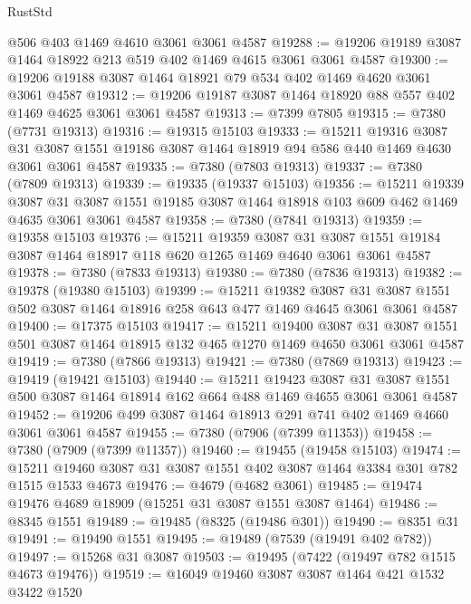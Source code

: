 \begin{lexlean}{RustStd}
\begin{coremodule}
    @506
    @403
    @1469
    @4610
    @3061
    @3061
    @4587
@19288 := @19206 @19189 @3087 @1464 @18922 @213 @519 @402 @1469 @4615 @3061 @3061 @4587
@19300 := @19206 @19188 @3087 @1464 @18921 @79 @534 @402 @1469 @4620 @3061 @3061 @4587
@19312 := @19206 @19187 @3087 @1464 @18920 @88 @557 @402 @1469 @4625 @3061 @3061 @4587
@19313 := @7399 @7805
@19315 := @7380 (@7731 @19313)
@19316 := @19315 @15103
@19333 := @15211
    @19316
    @3087
    @31
    @3087
    @1551
    @19186
    @3087
    @1464
    @18919
    @94
    @586
    @440
    @1469
    @4630
    @3061
    @3061
    @4587
@19335 := @7380 (@7803 @19313)
@19337 := @7380 (@7809 @19313)
@19339 := @19335 (@19337 @15103)
@19356 := @15211
    @19339
    @3087
    @31
    @3087
    @1551
    @19185
    @3087
    @1464
    @18918
    @103
    @609
    @462
    @1469
    @4635
    @3061
    @3061
    @4587
@19358 := @7380 (@7841 @19313)
@19359 := @19358 @15103
@19376 := @15211
    @19359
    @3087
    @31
    @3087
    @1551
    @19184
    @3087
    @1464
    @18917
    @118
    @620
    @1265
    @1469
    @4640
    @3061
    @3061
    @4587
@19378 := @7380 (@7833 @19313)
@19380 := @7380 (@7836 @19313)
@19382 := @19378 (@19380 @15103)
@19399 := @15211
    @19382
    @3087
    @31
    @3087
    @1551
    @502
    @3087
    @1464
    @18916
    @258
    @643
    @477
    @1469
    @4645
    @3061
    @3061
    @4587
@19400 := @17375 @15103
@19417 := @15211
    @19400
    @3087
    @31
    @3087
    @1551
    @501
    @3087
    @1464
    @18915
    @132
    @465
    @1270
    @1469
    @4650
    @3061
    @3061
    @4587
@19419 := @7380 (@7866 @19313)
@19421 := @7380 (@7869 @19313)
@19423 := @19419 (@19421 @15103)
@19440 := @15211
    @19423
    @3087
    @31
    @3087
    @1551
    @500
    @3087
    @1464
    @18914
    @162
    @664
    @488
    @1469
    @4655
    @3061
    @3061
    @4587
@19452 := @19206 @499 @3087 @1464 @18913 @291 @741 @402 @1469 @4660 @3061 @3061 @4587
@19455 := @7380 (@7906 (@7399 @11353))
@19458 := @7380 (@7909 (@7399 @11357))
@19460 := @19455 (@19458 @15103)
@19474 := @15211 @19460 @3087 @31 @3087 @1551 @402 @3087 @1464 @3384 @301 @782 @1515 @1533 @4673
@19476 := @4679 (@4682 @3061)
@19485 := @19474 @19476 @4689 @18909 (@15251 @31 @3087 @1551 @3087 @1464)
@19486 := @8345 @1551
@19489 := @19485 (@8325 (@19486 @301))
@19490 := @8351 @31
@19491 := @19490 @1551
@19495 := @19489 (@7539 (@19491 @402 @782))
@19497 := @15268 @31 @3087
@19503 := @19495 (@7422 (@19497 @782 @1515 @4673 @19476))
@19519 := @16049
    @19460
    @3087
    @3087
    @1464
    @421
    @1532
    @3422
    @1520

\end{coremodule}
\end{lexlean}
